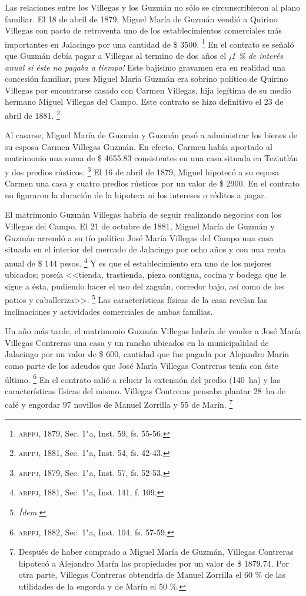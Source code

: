\documentclass[14pt,twoside,final]{extbook} %
\let\oldfootnote\footnote
\renewcommand\footnote[1]{%
\oldfootnote{\hspace{1mm}#1}}
\begin{document}
Las relaciones entre los Villegas y los Guzmán no sólo se circunscribieron al plano familiar. El 18 de abril de 1879, Miguel María de Guzmán vendió a Quirino Villegas con pacto de retroventa uno de los establecimientos comerciales más importantes en Jalacingo por una cantidad de \$ 3500.\footnote{\textsc{arppj}, 1879, Sec. 1"a, Inst. 59, fs. 55-56.} En el contrato se señaló que Guzmán debía pagar a Villegas al termino de dos años el \emph{¡1 \% de interés anual si éste no pagaba a tiempo!} Este bajísimo gravamen era en realidad una concesión familiar, pues Miguel María Guzmán era sobrino político de Quirino Villegas por encontrarse casado con Carmen Villegas, hija legítima de su medio hermano Miguel Villegas del Campo. Este contrato se hizo definitivo el 23 de abril de 1881.\footnote{\textsc{arppj}, 1881, Sec. 1"a, Inst. 54, fs. 42-43.}

Al casarse, Miguel María de Guzmán y Guzmán pasó a administrar los bienes de su esposa Carmen Villegas Guzmán. En efecto, Carmen había aportado al matrimonio una suma de \$ 4655.83 consistentes en una casa situada en Teziutlán y dos predios rústicos.\footnote{\textsc{arppj}, 1879, Sec. 1"a, Inst. 57, fs. 52-53.} El 16 de abril de 1879, Miguel hipotecó a su esposa Carmen una casa y cuatro predios rústicos por un valor de \$ 2900. En el contrato no figuraron la duración de la hipoteca ni los intereses o réditos a pagar.

El matrimonio Guzmán Villegas habría de seguir realizando negocios con los Villegas del Campo. El 21 de octubre de 1881, Miguel María de Guzmán y Guzmán arrendó a su tío político José María Villegas del Campo una casa situada en el interior del mercado de Jalacingo por ocho años y con una renta anual de \$ 144 pesos.\footnote{\textsc{arppj}, 1881, Sec. 1"a, Inst. 141, f. 109.} Y es que el establecimiento era uno de los mejores ubicados; poseía <<tienda, trastienda, pieza contigua, cocina y bodega que le sigue a ésta, pudiendo hacer el uso del zaguán, corredor bajo, así como de los patios y caballeriza>>.\footnote{\em Ídem.} Las características físicas de la casa revelan las inclinaciones y actividades comerciales de ambas familias.

Un año más tarde, el matrimonio Guzmán Villegas habría de vender a José María Villegas Contreras una casa y un rancho ubicados en la municipalidad de Jalacingo por un valor de \$ 600, cantidad que fue pagada por Alejandro Marín como parte de los adeudos que José María Villegas Contreras tenía con éste último.\footnote{\textsc{arppj}, 1882, Sec. 1"a, Inst. 104, fs. 57-59.} En el contrato salió a relucir la extensión del predio (140~ha) y las características físicas del mismo. Villegas Contreras pensaba plantar 28~ha de café y engordar 97 novillos de Manuel Zorrilla y 55 de Marín.\footnote{Después de haber comprado a Miguel María de Guzmán, Villegas Contreras hipotecó a Alejandro Marín las propiedades por un valor de \$ 1879.74. Por otra parte, Villegas Contreras obtendría de Manuel Zorrilla el 60 \% de las utilidades de la engorda y de Marín el 50 \%.}
\end{document}
